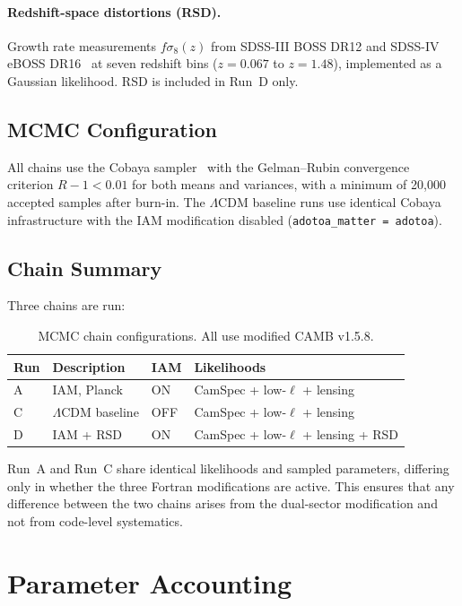 \documentclass[11pt]{article}
\begin{document}
\paragraph{Redshift-space distortions (RSD).}
Growth rate measurements $f\sigma_8(z)$ from SDSS-III BOSS DR12 and
SDSS-IV eBOSS DR16~\citep{Alam2017,Alam2021} at seven redshift bins
($z = 0.067$ to $z = 1.48$), implemented as a Gaussian likelihood.
RSD is included in Run~D only.

\subsection{MCMC Configuration}

All chains use the Cobaya sampler~\citep{Torrado2021} with the
Gelman--Rubin convergence criterion $R - 1 < 0.01$ for both means and
variances, with a minimum of 20,000 accepted samples after burn-in.
The $\Lambda$CDM baseline runs use identical Cobaya infrastructure with
the IAM modification disabled (\texttt{adotoa\_matter = adotoa}).

\subsection{Chain Summary}

Three chains are run:

\begin{table}[h]
\centering
\caption{MCMC chain configurations.  All use modified CAMB v1.5.8.}
\begin{tabular}{llll}
\toprule
Run & Description & IAM & Likelihoods \\
\midrule
A & IAM, Planck & ON & CamSpec + low-$\ell$ + lensing \\
C & $\Lambda$CDM baseline & OFF & CamSpec + low-$\ell$ + lensing \\
D & IAM + RSD & ON & CamSpec + low-$\ell$ + lensing + RSD \\
\bottomrule
\end{tabular}
\label{tab:chains}
\end{table}

Run~A and Run~C share identical likelihoods and sampled parameters,
differing only in whether the three Fortran modifications are active.
This ensures that any difference between the two chains arises from
the dual-sector modification and not from code-level systematics.



\section{Parameter Accounting}
\end{document}
